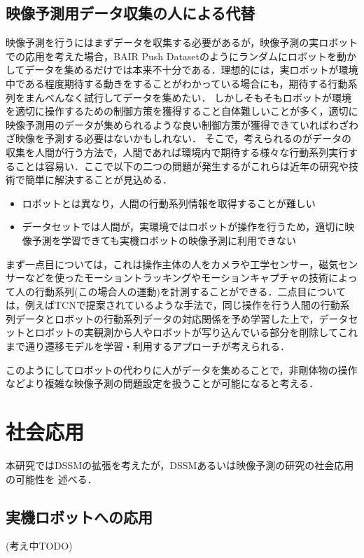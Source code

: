 \subsection{映像予測用データ収集の人による代替}
映像予測を行うにはまずデータを収集する必要があるが，映像予測の実ロボットでの応用を考えた場合，BAIR Push Datasetのようにランダムにロボットを動かしてデータを集めるだけでは本来不十分である．理想的には，実ロボットが環境中である程度期待する動きをすることがわかっている場合にも，期待する行動系列をまんべんなく試行してデータを集めたい．
しかしそもそもロボットが環境を適切に操作するための制御方策を獲得すること自体難しいことが多く，適切に映像予測用のデータが集められるような良い制御方策が獲得できていればわざわざ映像を予測する必要はないかもしれない．
そこで，考えられるのがデータの収集を人間が行う方法で，人間であれば環境内で期待する様々な行動系列実行することは容易い．ここで以下の二つの問題が発生するがこれらは近年の研究や技術で簡単に解決することが見込める．
\begin{itemize}
    \item ロボットとは異なり，人間の行動系列情報を取得することが難しい
    \item データセットでは人間が，実環境ではロボットが操作を行うため，適切に映像予測を学習できても実機ロボットの映像予測に利用できない
\end{itemize}

まず一点目については，これは操作主体の人をカメラや工学センサー，磁気センサーなどを使ったモーショントラッキングやモーションキャプチャの技術によって人の行動系列(この場合人の運動)を計測することができる．二点目については，例えばTCNで提案されているような手法で，同じ操作を行う人間の行動系列データとロボットの行動系列データの対応関係を予め学習した上で，データセットとロボットの実観測から人やロボットが写り込んでいる部分を削除してこれまで通り遷移モデルを学習・利用するアプローチが考えられる．

このようにしてロボットの代わりに人がデータを集めることで，非剛体物の操作などより複雑な映像予測の問題設定を扱うことが可能になると考える．

\section{社会応用}
本研究ではDSSMの拡張を考えたが，DSSMあるいは映像予測の研究の社会応用の可能性を
述べる．
\subsection{実機ロボットへの応用}
(考え中TODO)

